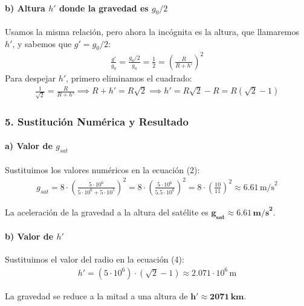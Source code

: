 \paragraph*{b) Altura $h'$ donde la gravedad es $g_0/2$}
Usamos la misma relación, pero ahora la incógnita es la altura, que llamaremos $h'$, y sabemos que $g' = g_0/2$:
\begin{gather}
    \frac{g'}{g_0} = \frac{g_0/2}{g_0} = \frac{1}{2} = \left(\frac{R}{R+h'}\right)^2
\end{gather}
Para despejar $h'$, primero eliminamos el cuadrado:
\begin{gather}
    \frac{1}{\sqrt{2}} = \frac{R}{R+h'} \implies R+h' = R\sqrt{2} \implies h' = R\sqrt{2} - R = R(\sqrt{2}-1)
\end{gather}

\subsubsection*{5. Sustitución Numérica y Resultado}
\paragraph*{a) Valor de $g_{sat}$}
Sustituimos los valores numéricos en la ecuación (2):
\begin{gather}
    g_{sat} = 8 \cdot \left(\frac{5 \cdot 10^6}{5 \cdot 10^6 + 5 \cdot 10^5}\right)^2 = 8 \cdot \left(\frac{5 \cdot 10^6}{5.5 \cdot 10^6}\right)^2 = 8 \cdot \left(\frac{10}{11}\right)^2 \approx 6.61 \, \text{m/s}^2
\end{gather}
\begin{cajaresultado}
    La aceleración de la gravedad a la altura del satélite es $\boldsymbol{g_{sat} \approx 6.61 \, \textbf{m/s}^2}$.
\end{cajaresultado}

\paragraph*{b) Valor de $h'$}
Sustituimos el valor del radio en la ecuación (4):
\begin{gather}
    h' = (5 \cdot 10^6) \cdot (\sqrt{2}-1) \approx 2.071 \cdot 10^6 \, \text{m}
\end{gather}
\begin{cajaresultado}
    La gravedad se reduce a la mitad a una altura de $\boldsymbol{h' \approx 2071 \, \textbf{km}}$.
\end{cajaresultado}

